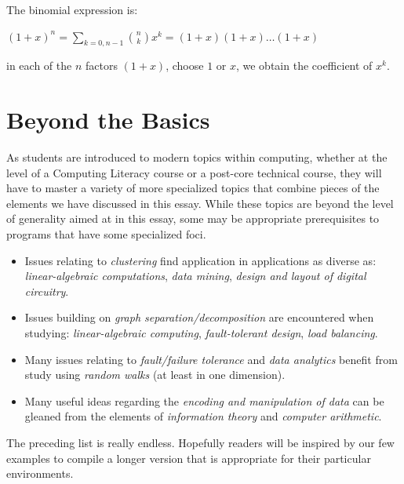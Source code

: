 The binomial expression is:

$(1+x)^n = \sum_{k=0,n-1} {n \choose k} x^k = (1+x)(1+x)\ldots(1+x)$

in each of the $n$ factors $(1+x)$, choose $1$ or $x$, we obtain the coefficient of $x^k$.

\medskip




\section{Beyond the Basics}

As students are introduced to modern topics within computing, whether
at the level of a Computing Literacy course or a post-core technical
course, they will have to master a variety of more specialized topics
that combine pieces of the elements we have discussed in this essay.
While these topics are beyond the level of generality aimed at in this
essay, some may be appropriate prerequisites to programs that have
some specialized foci.
\begin{itemize}
\item
Issues relating to {\em clustering} find application in applications as
diverse as: {\em linear-algebraic computations}, {\em data mining},
{\em design and layout of digital circuitry}.

\item
Issues building on {\em graph separation/decomposition} are
encountered when studying: {\em linear-algebraic computing}, {\em
  fault-tolerant design}, {\em load balancing}.

\item
Many issues relating to {\em fault/failure tolerance} and {\em data
  analytics} benefit from study using {\em random walks} (at least in
one dimension).

\item
Many useful ideas regarding the {\em encoding and manipulation of
  data} can be gleaned from the elements of {\em information theory}
and {\em computer arithmetic}.
\end{itemize}
The preceding list is really endless.  Hopefully readers will be
inspired by our few examples to compile a longer version that is
appropriate for their particular environments.

